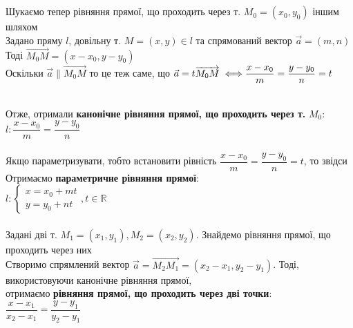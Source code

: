 \documentclass[a4paper, 14pt]{extarticle}
\def\bigline{\vspace{5mm}\\}
\begin{document}
\bigline
\\
Шукаємо тепер рівняння прямої, що проходить через т. $M_0 = (x_0, y_0)$ іншим шляхом\\
Задано пряму $l$, довільну т. $M = (x,y) \in l$ та спрямований вектор $\vec{a} = (m,n)$\\
Тоді $\overrightarrow{M_0M} = (x-x_0, y-y_0)$\\
Оскільки $\vec{a} \parallel \overrightarrow{M_0M}$ то це теж саме, що $\vec{a} = t \overrightarrow{M_0 M} \iff \\
\dfrac{x-x_0}{m} = \dfrac{y-y_0}{n} = t$\\
\\
Отже, отримали \textbf{канонічне рівняння прямої, що проходить через т.} $M_0$:\\
$l: \dfrac{x-x_0}{m} = \dfrac{y-y_0}{n}$\\
\bigline
Якщо параметризувати, тобто встановити рівність $\dfrac{x-x_0}{m} = \dfrac{y-y_0}{n} = t$, то звідси\\
Отримаємо \textbf{параметричне рівняння прямої}:\\
$l: \begin{cases}
x = x_0 + mt\\
y = y_0 + nt
\end{cases}, t \in \mathbb{R}
$
\bigline
\\
Задані дві т. $M_1 = (x_1,y_1), M_2 = (x_2,y_2)$. Знайдемо рівняння прямої, що проходить через них\\
Створимо спрямлений вектор $\vec{a} = \overrightarrow{M_2M_1} = (x_2-x_1,y_2-y_1)$. Тоді, використовуючи канонічне рівняння прямої,\\
отримаємо \textbf{рівняння прямої, що проходить через дві точки}:\\
$\dfrac{x-x_1}{x_2-x_1} = \dfrac{y-y_1}{y_2-y_1}$
\bigline
\end{document}
